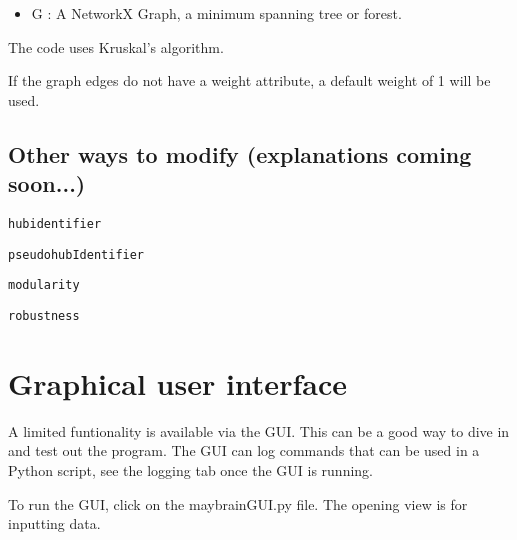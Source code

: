 \documentclass{report}
\begin{document}
\begin{itemize}
\item G : A NetworkX Graph, a minimum spanning tree or forest. 
\end{itemize}

        The code uses Kruskal's algorithm.
    
        If the graph edges do not have a weight attribute, a default weight of 1
        will be used.

\subsection{Other ways to modify (explanations coming soon...)}

\texttt{hubidentifier}

\texttt{pseudohubIdentifier}

\texttt{modularity}

\texttt{robustness}


\section{Graphical user interface}
A limited funtionality is available via the GUI. This can be a good way to dive in and test out the program. The GUI can log commands that can be used in a Python script, see the logging tab once the GUI is running.

To run the GUI, click on the maybrainGUI.py file. The opening view is for inputting data.

\end{document}
